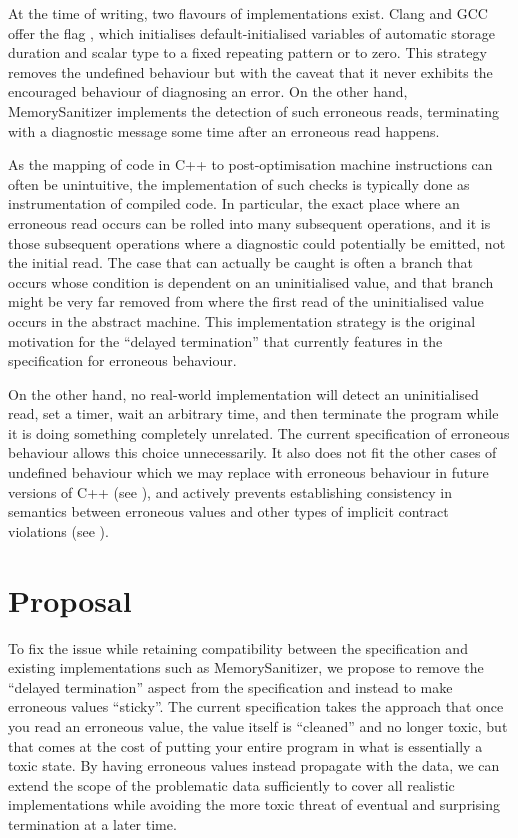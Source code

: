 At the time of writing, two flavours of \cite{P2795R5} implementations exist. Clang and GCC offer the flag \mbox{}, which initialises default-initialised variables of automatic storage duration and scalar type to a fixed repeating pattern or to zero. This strategy removes the undefined behaviour but with the caveat that it never exhibits the encouraged behaviour of diagnosing an error. On the other hand, MemorySanitizer implements the detection of such erroneous reads, terminating with a diagnostic message some time after an erroneous read happens.

As the mapping of code in C++ to  post-optimisation machine instructions can often be unintuitive, the implementation  of such checks is typically done as instrumentation of compiled code.  In particular, the exact place where an erroneous read occurs can be rolled into many subsequent operations, and it is those subsequent operations where a diagnostic could potentially be emitted, not the initial read.  The case that can actually be caught is often a branch that occurs whose condition is dependent on an uninitialised value, and that branch might be very far removed from where the first read of the uninitialised value occurs in the abstract machine. This implementation strategy is the original motivation for the ``delayed termination'' that currently features in the specification for erroneous behaviour.

On the other hand, no real-world implementation will detect an uninitialised read, set a timer, wait an arbitrary time, and then terminate the program while it is doing something completely unrelated.  The current specification of erroneous behaviour allows this choice unnecessarily. It also does not fit the other cases of undefined behaviour which we may replace with erroneous behaviour in future versions of C++ (see \cite{P3100R4}), and actively prevents establishing consistency in semantics between erroneous values and other types of implicit contract violations (see \cite{P3229R0}).

\section{Proposal}

To fix the issue while retaining compatibility between the specification and existing implementations such as MemorySanitizer, we propose to remove the ``delayed termination'' aspect from the specification and instead to make erroneous values ``sticky''.  The current specification takes the approach that once you read an erroneous value, the value itself is ``cleaned'' and no longer toxic, but that comes at the cost of putting your entire program in what is essentially a toxic state. By having erroneous values instead propagate with the data, we can extend the scope of the problematic data sufficiently to cover all realistic implementations while avoiding the more toxic threat of eventual and surprising termination at a later time.

